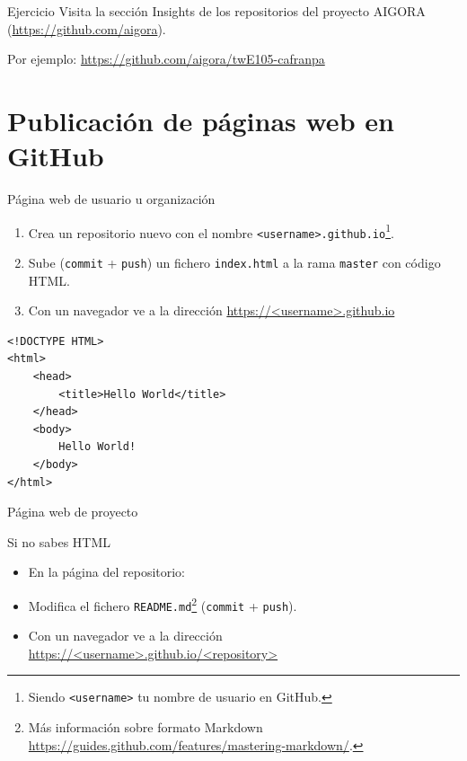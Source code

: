 \documentclass[xcolor={usenames,svgnames,dvipsnames}]{beamer}
\begin{document}
\begin{frame}[label={sec:org31f45cd}]{}
\begin{block}{Ejercicio}
Visita la sección Insights de los repositorios del proyecto AIGORA (\url{https://github.com/aigora}). 

Por ejemplo: \url{https://github.com/aigora/twE105-cafranpa}
\end{block}
\end{frame}

\section{Publicación de páginas web en GitHub}
\label{sec:org639c1ec}

\begin{frame}[label={sec:org05cfce7},fragile]{Página web de \alert{usuario u organización}}
 \begin{enumerate}
\item Crea un repositorio nuevo con el nombre \texttt{<username>.github.io}\footnote{Siendo \texttt{<username>} tu nombre de usuario en GitHub.}.
\item Sube (\texttt{commit} + \texttt{push}) un fichero \texttt{index.html} a la rama \texttt{master} con código HTML.
\item Con un navegador ve a la dirección \url{https://<username>.github.io}
\end{enumerate}

\lstset{language=HTML,label= ,caption= ,captionpos=b,numbers=none}
\begin{lstlisting}
<!DOCTYPE HTML>
<html>
	<head>
		<title>Hello World</title>
	</head>
	<body>
		Hello World!
	</body>
</html>
\end{lstlisting}
\end{frame}

\begin{frame}[label={sec:orga6eed8e},fragile]{Página web de \alert{proyecto}}
 \begin{block}{Si no sabes HTML}
\begin{itemize}
\item En la página del repositorio:
\end{itemize}

\begin{center}

\end{center}

\begin{itemize}
\item Modifica el fichero \texttt{README.md}\footnote{Más información sobre formato Markdown \url{https://guides.github.com/features/mastering-markdown/}.} (\texttt{commit} + \texttt{push}).

\item Con un navegador ve a la dirección \url{https://<username>.github.io/<repository>}
\end{itemize}
\end{block}
\end{frame}
\end{document}
